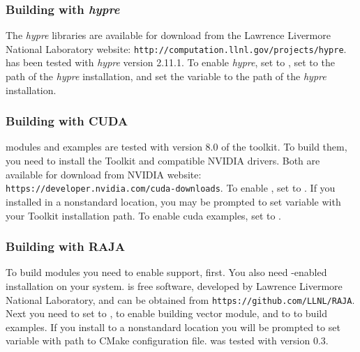 \subsubsection*{Building with \textit{hypre}}
The \textit{hypre} libraries are available for download from the Lawrence Livermore
National Laboratory website: {\tt http://computation.llnl.gov/projects/hypre}.
{\sundials} has been tested with \textit{hypre} version 2.11.1. 
To enable \textit{hypre}, set   to , set 
to the  path of the \textit{hypre} installation, and set the variable
 to the  path of the \textit{hypre} installation.

\subsubsection*{Building with CUDA}
{\sundials} {\cuda} modules and examples are tested with version 8.0 of the 
{\cuda} toolkit. To build them, you need to install the Toolkit and compatible
NVIDIA drivers. Both are available for download from NVIDIA website:
{\tt https://developer.nvidia.com/cuda-downloads}. To enable {\cuda}, 
set  to . If you
installed {\cuda} in a nonstandard location, you may be prompted to set
variable  with your {\cuda} Toolkit installation
path. To enable cuda examples, set  to .

\subsubsection*{Building with RAJA}
To build {\sundials} {\raja} modules you need to enable {\sundials} {\cuda}
support, first. You also need {\cuda}-enabled {\raja} installation on your
system. {\raja} is free software, developed by Lawrence Livermore
National Laboratory, and can be obtained from {\tt https://github.com/LLNL/RAJA}.
Next you need to set  to , to enable building {\raja}
vector module, and   to  to build {\raja}
examples. If you install {\raja} to a nonstandard location you will be 
prompted to set variable  with path to {\raja} CMake configuration
file. {\sundials} was tested with {\raja} version 0.3.

